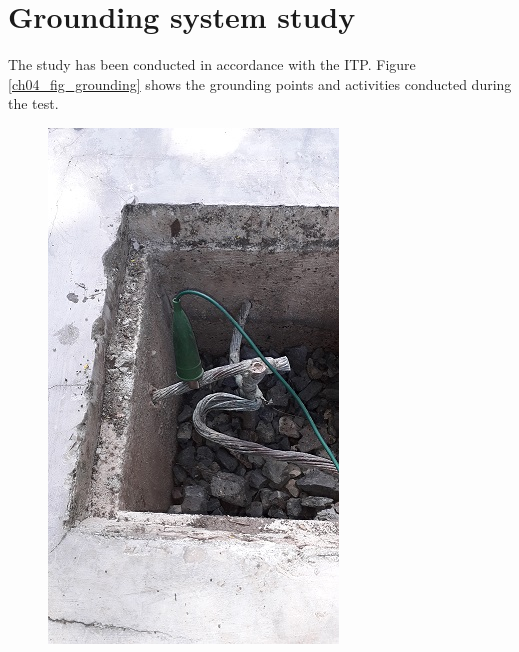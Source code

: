 \section{Grounding system study} \label{ch04_elecaudit_groundingsystem}
The study has been conducted in accordance with the ITP. Figure \ref{ch04_fig_grounding} shows the grounding points and activities conducted during the test.


\begin{figure}
	\begin{minipage}[b]{0.22\linewidth}
	\centering
	\includegraphics[width=\textwidth]{figures/R1P_grounding/grounding1.jpg}

\end{minipage}
\end{figure}

